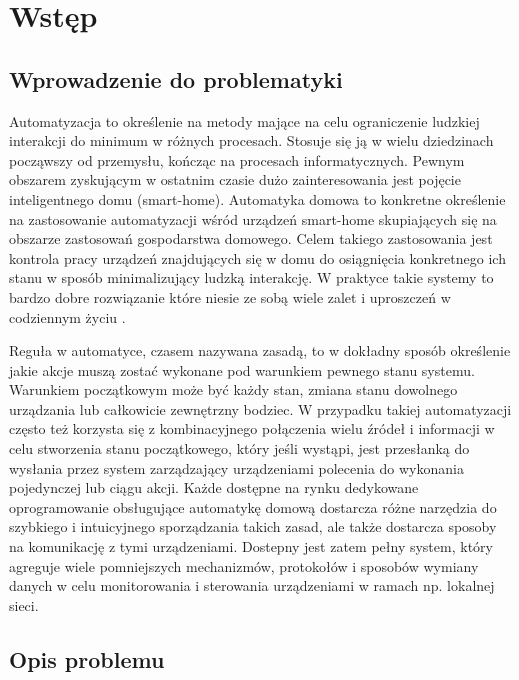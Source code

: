 
\chapter{Wstęp}

\section{Wprowadzenie do problematyki}

Automatyzacja to określenie na metody mające na celu ograniczenie ludzkiej interakcji do minimum w różnych procesach. Stosuje się ją w wielu dziedzinach począwszy od przemysłu, kończąc na procesach informatycznych. Pewnym obszarem zyskującym w ostatnim czasie dużo zainteresowania jest pojęcie inteligentnego domu (smart-home). Automatyka domowa to konkretne określenie na zastosowanie automatyzacji wśród urządzeń smart-home skupiających się na obszarze zastosowań gospodarstwa domowego. Celem takiego zastosowania jest kontrola pracy urządzeń znajdujących się w domu do osiągnięcia konkretnego ich stanu w sposób minimalizujący ludzką interakcję. W praktyce takie systemy to bardzo dobre rozwiązanie które niesie ze sobą wiele zalet i uproszczeń w codziennym życiu \cite{szablowski2019projektowanie}.

Reguła w automatyce, czasem nazywana zasadą, to w dokładny sposób określenie jakie akcje muszą zostać wykonane pod warunkiem pewnego stanu systemu. Warunkiem początkowym może być każdy stan, zmiana stanu dowolnego urządzania lub całkowicie zewnętrzny bodziec. W przypadku takiej automatyzacji często też korzysta się z kombinacyjnego połączenia wielu źródeł i informacji w celu stworzenia stanu początkowego, który jeśli wystąpi, jest przesłanką do wysłania przez system zarządzający urządzeniami polecenia do wykonania pojedynczej lub ciągu akcji. Każde dostępne na rynku dedykowane oprogramowanie obsługujące automatykę domową dostarcza różne narzędzia do szybkiego i intuicyjnego sporządzania takich zasad, ale także dostarcza sposoby na komunikację z tymi urządzeniami. Dostepny jest zatem pełny system, który agreguje wiele pomniejszych mechanizmów, protokołów i sposobów wymiany danych w celu monitorowania i sterowania urządzeniami w ramach np. lokalnej sieci.

\section{Opis problemu}

